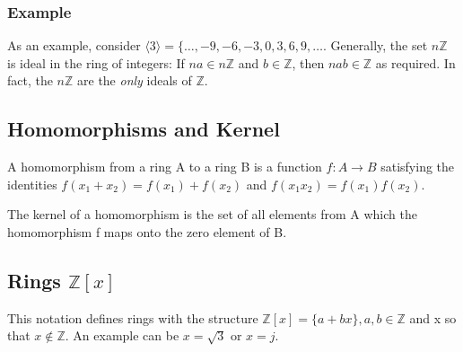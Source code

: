 \subsubsection{Example}\label{example}

As an example, consider
$\langle 3 \rangle = \{\ldots, -9, -6, -3, 0, 3, 6, 9, \ldots$.
Generally, the set \(n \mathbb{Z}\) is ideal in the ring of integers: If
\(na \in n \mathbb{Z}\) and \(b \in \mathbb{Z}\), then
\(nab \in \mathbb{Z}\) as required. In fact, the \(n \mathbb{Z}\) are
the \emph{only} ideals of $\mathbb{Z}$.

\subsection{Homomorphisms and Kernel}\label{homomorphisms-and-kernel}

A homomorphism from a ring A to a ring B is a function
\(f: A \rightarrow B\) satisfying the identities
\(f(x_1+x_2) = f(x_1) + f(x_2)\) and \(f(x_1 x_2) = f(x_1) f(x_2)\).

The kernel of a homomorphism is the set of all elements from A which the
homomorphism f maps onto the zero element of B.

\subsection{\texorpdfstring{Rings
\(\mathbb{Z}[x]\)}{Rings \textbackslash{}mathbb\{Z\}{[}x{]}}}\label{rings-mathbbzx}

This notation defines rings with the structure
\(\mathbb{Z}[x] = \{a + b x \}, a,b \in \mathbb{Z}\) and x so that
\(x \notin \mathbb{Z}\). An example can be \(x=\sqrt{3}\) or \(x=j\).
